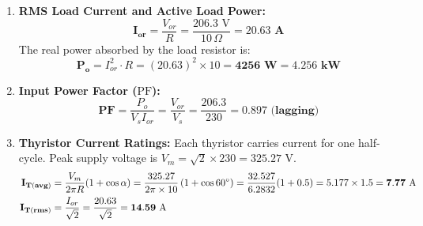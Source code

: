 \documentclass[11pt,a4paper]{article}
\begin{document}
\begin{examplebox}
\begin{enumerate}
  \item \textbf{RMS Load Current and Active Load Power:}
  \begin{equation*}
  \mathbf{I_{or}} = \frac{V_{or}}{R} = \frac{206.3\text{ V}}{10\,\Omega} = \mathbf{20.63\text{ A}}
  \end{equation*}
  The real power absorbed by the load resistor is:
  \begin{equation*}
  \mathbf{P_o} = I_{or}^2 \cdot R = (20.63)^2 \times 10 = \mathbf{4256\text{ W} = 4.256\text{ kW}}
  \end{equation*}

  \item \textbf{Input Power Factor ($\text{PF}$):}
  \begin{equation*}
  \mathbf{\text{PF}} = \frac{P_o}{V_s I_{or}} = \frac{V_{or}}{V_s} = \frac{206.3}{230} = \mathbf{0.897\text{ (lagging)}}
  \end{equation*}

  \item \textbf{Thyristor Current Ratings:}
  Each thyristor carries current for one half-cycle. Peak supply voltage is $V_m = \sqrt{2} \times 230 = 325.27\text{ V}$.
  \begin{align*}
  \mathbf{I_{T(avg)}} &= \frac{V_m}{2\pi R}(1 + \cos\alpha) = \frac{325.27}{2\pi \times 10}\left(1 + \cos 60^\circ\right) = \frac{32.527}{6.2832} (1 + 0.5) = 5.177 \times 1.5 = \mathbf{7.77\text{ A}} \notag\\
  \mathbf{I_{T(rms)}} &= \frac{I_{or}}{\sqrt{2}} = \frac{20.63}{\sqrt{2}} = \mathbf{14.59\text{ A}}
  \end{align*}
\end{enumerate}
\end{examplebox}
\end{document}
